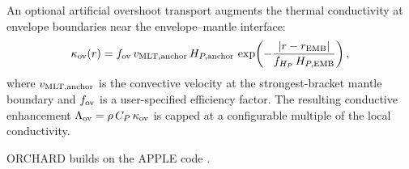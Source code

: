 \documentclass{aastex631}
\newcommand{\Cp}{C_P}
\begin{document}
An optional artificial overshoot transport augments the thermal
conductivity at envelope boundaries near the envelope--mantle interface:
\begin{equation}
  \kappa_{\rm ov}(r)
  = f_{\rm ov}\,v_{\rm MLT,anchor}\,H_{P,{\rm anchor}}
    \,\exp\!\left(-\frac{|r - r_{\rm EMB}|}{f_{H_P}\,H_{P,{\rm EMB}}}\right),
\end{equation}
where $v_{\rm MLT,anchor}$ is the convective velocity at the
strongest-bracket mantle boundary and $f_{\rm ov}$ is a user-specified
efficiency factor.  The resulting conductive enhancement
$\Lambda_{\rm ov} = \rho\,\Cp\,\kappa_{\rm ov}$ is capped at a
configurable multiple of the local conductivity.


\begin{acknowledgments}
ORCHARD builds on the APPLE code \citep{Sur2024}.
\end{acknowledgments}



\end{document}

